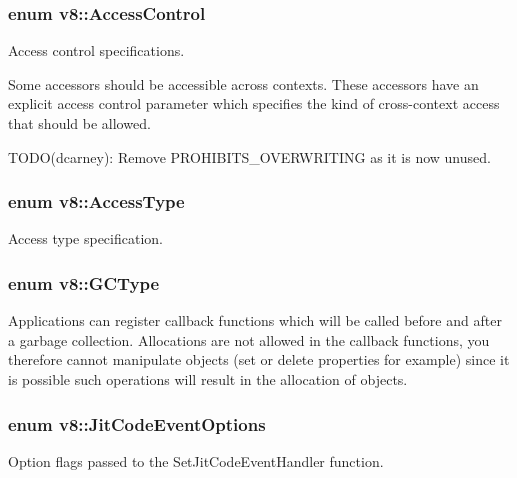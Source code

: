 \subsubsection[{Access\+Control}]{\setlength{\rightskip}{0pt plus 5cm}enum {\bf v8\+::\+Access\+Control}}\label{namespacev8_a31d8355cb043d7d2dda3f4a52760b64e}
Access control specifications.

Some accessors should be accessible across contexts. These accessors have an explicit access control parameter which specifies the kind of cross-\/context access that should be allowed.

T\+O\+D\+O(dcarney)\+: Remove P\+R\+O\+H\+I\+B\+I\+T\+S\+\_\+\+O\+V\+E\+R\+W\+R\+I\+T\+I\+N\+G as it is now unused. \hypertarget{namespacev8_add8bef6469c5b94706584124e610046c}{}
\subsubsection[{Access\+Type}]{\setlength{\rightskip}{0pt plus 5cm}enum {\bf v8\+::\+Access\+Type}}\label{namespacev8_add8bef6469c5b94706584124e610046c}
Access type specification. \hypertarget{namespacev8_ac109d6f27e0c0f9ef4e98bcf7a806cf2}{}
\subsubsection[{G\+C\+Type}]{\setlength{\rightskip}{0pt plus 5cm}enum {\bf v8\+::\+G\+C\+Type}}\label{namespacev8_ac109d6f27e0c0f9ef4e98bcf7a806cf2}
Applications can register callback functions which will be called before and after a garbage collection. Allocations are not allowed in the callback functions, you therefore cannot manipulate objects (set or delete properties for example) since it is possible such operations will result in the allocation of objects. \hypertarget{namespacev8_a06f34fa4fa4cfc8518366808d1d461c1}{}
\subsubsection[{Jit\+Code\+Event\+Options}]{\setlength{\rightskip}{0pt plus 5cm}enum {\bf v8\+::\+Jit\+Code\+Event\+Options}}\label{namespacev8_a06f34fa4fa4cfc8518366808d1d461c1}
Option flags passed to the Set\+Jit\+Code\+Event\+Handler function. 
